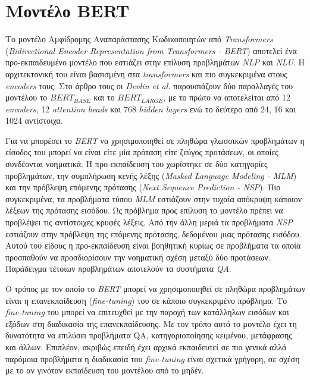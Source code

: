 \section{Μοντέλο BERT}
Το μοντέλο Αμφίδρομης Αναπαράστασης Κωδικοποιητών από \emph{Transformers} \linebreak(\emph{Bidirectional Encoder Representation from Transformers - BERT}) \cite{bert} αποτελεί ένα προ-εκπαιδευμένο μοντέλο που εστιάζει στην επίλυση προβλημάτων \emph{NLP} και \emph{NLU}. Η αρχιτεκτονική του είναι βασισμένη στα \emph{transformers} και πιο συγκεκριμένα στους \emph{encoders} τους. Στο άρθρο τους \cite{bert} οι \emph{Devlin et al.} παρουσιάζουν δύο παραλλαγές του μοντέλου το $BERT_{BASE}$ και το $BERT_{LARGE}$, με το πρώτο να αποτελείται από 12 \emph{encoders}, 12 \emph{attention heads} και 768 \emph{hidden layers} ενώ το δεύτερο από 24, 16 και 1024 αντίστοιχα.

Για να μπορέσει το \emph{BERT} να χρησιμοποιηθεί σε πληθώρα γλωσσικών προβλημάτων η είσοδος του μπορεί να είναι είτε μία πρόταση είτε ζεύγος προτάσεων, οι οποίες συνδέονται νοηματικά. Η προ-εκπαίδευση του χωρίστηκε σε δύο κατηγορίες προβλημάτων, την συμπλήρωση κενής λέξης (\emph{Masked Language Modeling - MLM}) και την πρόβλεψη επόμενης πρότασης (\emph{Next Sequence Prediction - NSP}). Πιο συγκεκριμένα, τα προβλήματα τύπου \emph{MLM} εστιάζουν στην τυχαία απόκρυψη κάποιον λέξεων της πρότασης εισόδου. Ως πρόβλημα προς επίλυση το μοντέλο πρέπει να προβλέψει τις αντίστοιχες κρυφές λέξεις. Από την άλλη μεριά τα προβλήματα \emph{NSP} εστιάζουν στην πρόβλεψη της επόμενης πρότασης, δεδομένου μιας πρότασης εισόδου. Αυτού του είδους η προ-εκπαίδευση είναι βοηθητική κυρίως σε προβλήματα τα οποία προσπαθούν να προσδιορίσουν την νοηματική σχέση μεταξύ δύο προτάσεων. Παράδειγμα τέτοιων προβλημάτων αποτελούν τα συστήματα \emph{QA}.

Ο τρόπος με τον οποίο το \emph{BERT} μπορεί να χρησιμοποιηθεί σε πληθώρα προβλημάτων είναι η επανεκπαίδευση (\emph{fine-tuning}) του σε κάποιο συγκεκριμένο πρόβλημα. Το \emph{fine-tuning} του μπορεί να επιτευχθεί με την παροχή των κατάλληλων εισόδων και εξόδων στη διαδικασία της επανεκπαίδευσης. Με τον τρόπο αυτό το μοντέλο έχει τη δυνατότητα να επιλύσει προβλήματα QA, κατηγοριοποίησης κειμένου, μετάφρασης και άλλων. Επιπλέον, ακριβώς επειδή έχει αρχικά εκπαιδευτεί σε πιο γενικά αλλά παρόμοια προβλήματα η διαδικασία του \emph{fine-tuning} είναι σχετικά γρήγορη, σε σχέση με το αν γινόταν εκπαίδευση του μοντέλου από το μηδέν.

